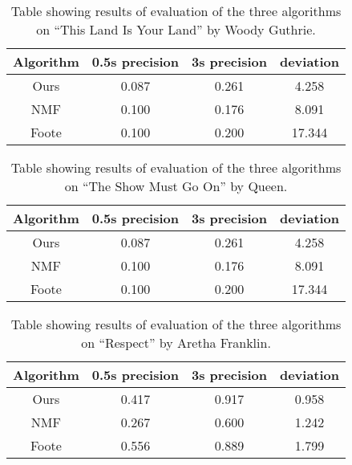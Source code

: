 \begin{table}
\begin{center}
\begin{tabular}{| c | c | c | c |} \hline 
Algorithm  &   0.5s precision   	&  3s precision 	&   deviation   	\\ \hline \hline
Ours			& 	0.087				&  0.261				& 	4.258		\\ \hline
NMF			&  0.100				&  0.176				&	8.091		\\ \hline
Foote		&  0.100				&  0.200				& 	17.344		\\ \hline
\end{tabular}
\caption{Table showing results of evaluation of the three algorithms on ``This Land Is Your Land'' by Woody Guthrie.}
\label{table:evalLand}
\end{center}
\end{table}

\begin{table}
\begin{center}
\begin{tabular}{| c | c | c | c |} \hline 
Algorithm  &   0.5s precision   	&  3s precision 	&   deviation   	\\ \hline \hline
Ours			& 	0.087				&  0.261				& 	4.258		\\ \hline
NMF			&  0.100				&  0.176				&	8.091		\\ \hline
Foote		&  0.100				&  0.200				& 	17.344		\\ \hline
\end{tabular}
\caption{Table showing results of evaluation of the three algorithms on ``The Show Must Go On'' by Queen.}
\label{table:evalShowmusthoon}
\end{center}
\end{table}

\begin{table}
\begin{center}
\begin{tabular}{| c | c | c | c |} \hline 
Algorithm  &   0.5s precision   	&  3s precision 	&   deviation   	\\ \hline \hline
Ours			& 	0.417				&  0.917				& 	0.958		\\ \hline
NMF			&  0.267				&  0.600				&	1.242		\\ \hline
Foote		&  0.556				&  0.889				& 	1.799		\\ \hline
\end{tabular}
\caption{Table showing results of evaluation of the three algorithms on ``Respect'' by Aretha Franklin.}
\label{table:evalRespect}
\end{center}
\end{table}

